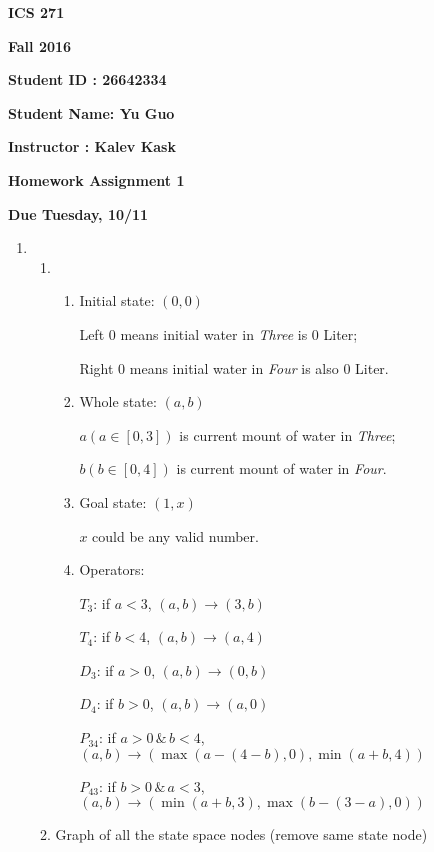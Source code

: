 \documentclass{article}
\begin{document}
{\bf ICS 271}

{\bf Fall 2016}

{\bf Student ID : 26642334}

{\bf Student Name: Yu Guo}

{\bf Instructor : Kalev Kask}

{\bf Homework Assignment 1}

{\bf Due Tuesday, 10/11}




\begin{enumerate}

\item

\begin{enumerate}
\item

\begin{enumerate}
\item Initial state: $(0,0)$

  Left $0$ means initial water in \emph{Three} is $0$ Liter;

  Right $0$ means initial water in \emph{Four} is also $0$ Liter.

\item Whole state: $(a,b)$

  $a(a\in[0,3])$ is current mount of water in \emph{Three};

  $b(b\in[0,4])$ is current mount of water in \emph{Four}. 

\item Goal state: $(1,x)$

  $x$ could be any valid number.

\item Operators: 

$T_3$: if $a<3$, $(a,b)\rightarrow(3,b)$ 

$T_4$: if $b<4$, $(a,b)\rightarrow(a,4)$ 

$D_3$: if $a>0$, $(a,b)\rightarrow(0,b)$ 

$D_4$: if $b>0$, $(a,b)\rightarrow(a,0)$

$P_{34}$: if $a>0\, \&\, b<4$, $(a,b)\rightarrow(\max(a-(4-b),0),\min(a+b,4))$

$P_{43}$: if $b>0\, \&\, a<3$, $(a,b)\rightarrow(\min(a+b,3),\max(b-(3-a),0))$


\end{enumerate}

\item Graph of all the state space nodes (remove same state node)


\end{enumerate}
\end{enumerate}
\end{document}
